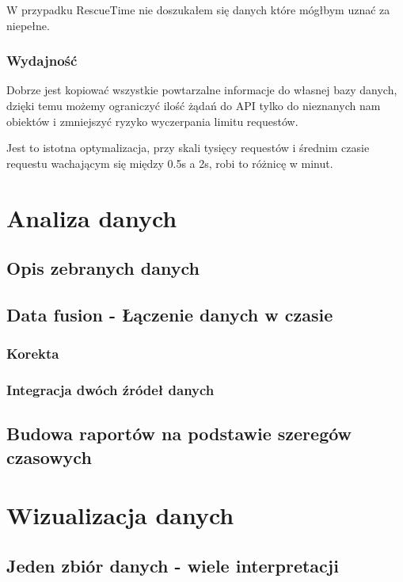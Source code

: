 \documentclass[brudnopis]{xmgr}
\begin{document}
        W przypadku RescueTime nie doszukałem się danych które mógłbym uznać za niepełne.

        \subsection*{Wydajność}
        Dobrze jest kopiować wszystkie powtarzalne informacje do własnej bazy danych,
        dzięki temu możemy ograniczyć ilość żądań do API tylko do nieznanych nam obiektów i zmniejszyć ryzyko wyczerpania limitu requestów.

		 Jest to istotna optymalizacja, przy skali tysięcy requestów i średnim czasie requestu wachającym się między 0.5s a 2s, 
		 robi to różnicę w minut.

\chapter{Analiza danych}

    \section{Opis zebranych danych}


    \section{Data fusion - Łączenie danych w czasie}

        \subsection*{Korekta}

        \subsection*{Integracja dwóch źródeł danych}

     \section{Budowa raportów na podstawie szeregów czasowych}



\chapter{Wizualizacja danych}

     \section{Jeden zbiór danych - wiele interpretacji}
\end{document}
